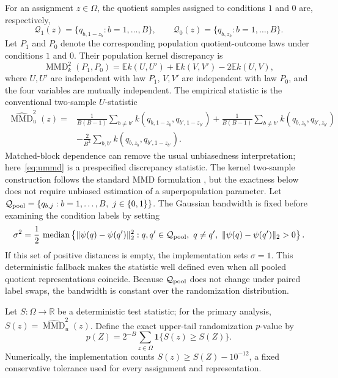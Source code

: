 \documentclass[11pt]{article}
\theoremstyle{plain}
\theoremstyle{definition}
\numberwithin{equation}{section}
\DeclareMathOperator{\MMD}{MMD}
\newcommand{\E}{\mathbb E}
\newcommand{\1}{\mathbf 1}
\newcommand{\calQ}{\mathcal Q}
\begin{document}
For an assignment $z\in\Omega$, the quotient samples assigned to
conditions $1$ and $0$ are, respectively,
\[
\calQ_1(z)=\{q_{b,1-z_b}:b=1,\ldots,B\},
\qquad
\calQ_0(z)=\{q_{b,z_b}:b=1,\ldots,B\}.
\]
Let $P_1$ and $P_0$ denote the corresponding population
quotient-outcome laws under conditions $1$ and $0$. Their population
kernel discrepancy is
\begin{equation}\label{eq:mmd}
	\MMD_k^2(P_1,P_0)
	=
	\E k(U,U')
	+
	\E k(V,V')
	-
	2\E k(U,V),
\end{equation}
where $U,U'$ are independent with law $P_1$, $V,V'$ are independent
with law $P_0$, and the four variables are mutually independent. The empirical statistic is the conventional two-sample $U$-statistic
\begin{align}\label{eq:ummd}
\widehat{\MMD}_u^2(z)
={}&\frac{1}{B(B-1)}\sum_{b\ne b'}k(q_{b,1-z_b},q_{b',1-z_{b'}})
+\frac{1}{B(B-1)}\sum_{b\ne b'}k(q_{b,z_b},q_{b',z_{b'}})\nonumber\\
&-\frac{2}{B^2}\sum_{b,b'}k(q_{b,z_b},q_{b',1-z_{b'}}).
\end{align}
Matched-block dependence can remove the usual unbiasedness interpretation; here~\eqref{eq:ummd} is a prespecified discrepancy statistic. The kernel two-sample construction follows the standard MMD formulation \citep{Gretton2012}, but the exactness below does not require unbiased estimation of a superpopulation parameter. Let $\calQ_{\rm pool}=\{q_{b,j}:b=1,\ldots,B,\ j\in\{0,1\}\}$.
The Gaussian bandwidth is fixed before examining the condition labels
by setting
\[
\sigma^2
=
\frac12\,
\operatorname{median}
\left\{
\|\psi(q)-\psi(q')\|_2^2:
q,q'\in\calQ_{\rm pool},\
q\ne q',\
\|\psi(q)-\psi(q')\|_2>0
\right\}.
\]
If this set of positive distances is empty, the implementation sets
$\sigma=1$. This deterministic fallback makes the statistic well defined even
when all pooled quotient representations coincide.
Because $\calQ_{\rm pool}$ does not change under paired label swaps,
the bandwidth is constant over the randomization distribution.

Let $S:\Omega\to\mathbb R$ be a deterministic test statistic; for the
primary analysis, $S(z)=\widehat{\MMD}_u^2(z)$. Define the exact
upper-tail randomization $p$-value by
\begin{equation}\label{eq:pvalue}
	p(Z)
	=
	2^{-B}
	\sum_{z\in\Omega}
	\mathbf 1\{S(z)\ge S(Z)\}.
\end{equation}
Numerically, the implementation counts
$S(z)\ge S(Z)-10^{-12}$, a fixed conservative tolerance used for every
assignment and representation.
\end{document}
